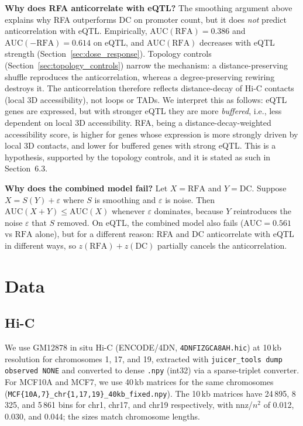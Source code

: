 \documentclass[11pt,a4paper]{article}
\begin{document}
\textbf{Why does RFA anticorrelate with eQTL?} The smoothing argument above explains why RFA outperforms DC on promoter count, but it does \emph{not} predict anticorrelation with eQTL. Empirically, $\mathrm{AUC}(\mathrm{RFA}) = 0.386$ and $\mathrm{AUC}(-\mathrm{RFA}) = 0.614$ on eQTL, and $\mathrm{AUC}(\mathrm{RFA})$ decreases with eQTL strength (Section~\ref{sec:dose_response}). Topology controls (Section~\ref{sec:topology_controls}) narrow the mechanism: a distance-preserving shuffle reproduces the anticorrelation, whereas a degree-preserving rewiring destroys it. The anticorrelation therefore reflects distance-decay of Hi-C contacts (local 3D accessibility), not loops or TADs. We interpret this as follows: eQTL genes are expressed, but with stronger eQTL they are more \emph{buffered}, i.e., less dependent on local 3D accessibility. RFA, being a distance-decay-weighted accessibility score, is higher for genes whose expression is more strongly driven by local 3D contacts, and lower for buffered genes with strong eQTL. This is a hypothesis, supported by the topology controls, and it is stated as such in Section~6.3.

\textbf{Why does the combined model fail?} Let $X = \mathrm{RFA}$ and $Y = \mathrm{DC}$. Suppose $X = S(Y) + \varepsilon$ where $S$ is smoothing and $\varepsilon$ is noise. Then $\mathrm{AUC}(X+Y) \leq \mathrm{AUC}(X)$ whenever $\varepsilon$ dominates, because $Y$ reintroduces the noise $\varepsilon$ that $S$ removed. On eQTL, the combined model also fails ($\mathrm{AUC}=0.561$ vs $\mathrm{RFA}$ alone), but for a different reason: RFA and DC anticorrelate with eQTL in different ways, so $z(\mathrm{RFA}) + z(\mathrm{DC})$ partially cancels the anticorrelation.

\section{Data}

\subsection{Hi-C}
We use GM12878 in situ Hi-C (ENCODE/4DN, \texttt{4DNFIZGCA8AH.hic}) at 10\,kb resolution \cite{rao2014} for chromosomes 1, 17, and 19, extracted with \texttt{juicer\_tools dump observed NONE} and converted to dense \texttt{.npy} (int32) via a sparse-triplet converter. For MCF10A and MCF7, we use 40\,kb matrices for the same chromosomes (\texttt{MCF\{10A,7\}\_chr\{1,17,19\}\_40kb\_fixed.npy}). The 10\,kb matrices have 24\,895, 8\,325, and 5\,861 bins for chr1, chr17, and chr19 respectively, with nnz/$n^2$ of 0.012, 0.030, and 0.044; the sizes match chromosome lengths.
\end{document}
